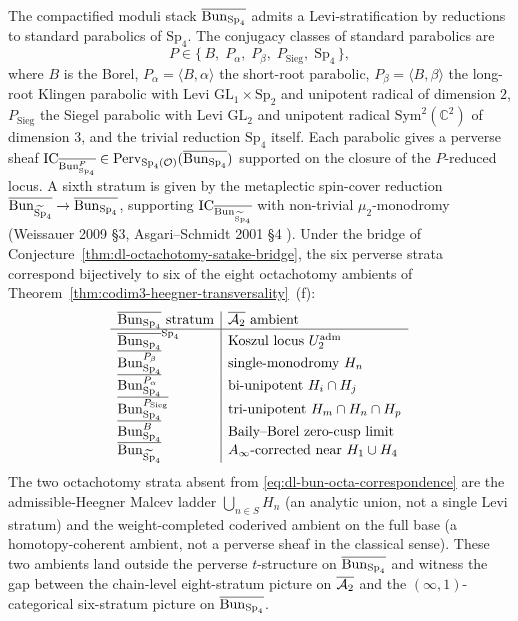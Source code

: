 \begin{remark}
\label{rem:dl-six-strata-bun-sp4}
%
%
The compactified moduli stack $\overline{\mathrm{Bun}_{\mathrm{Sp}_4}}$ admits a
Levi-stratification by reductions to standard parabolics of
$\mathrm{Sp}_4$. The conjugacy classes of standard parabolics are
\[
 P\in\bigl\{\,B,\;P_\alpha,\;P_\beta,\;P_{\mathrm{Sieg}},\;
 \mathrm{Sp}_4\,\bigr\},
\]
where $B$ is the Borel, $P_\alpha=\langle B,\alpha\rangle$ the
short-root parabolic, $P_\beta=\langle B,\beta\rangle$ the long-root
Klingen parabolic with Levi
$\mathrm{GL}_1\times\mathrm{Sp}_2$ and unipotent radical of
dimension $2$, $P_{\mathrm{Sieg}}$ the Siegel parabolic with Levi
$\mathrm{GL}_2$ and unipotent radical $\mathrm{Sym}^2(\mathbb{C}^2)$
of dimension $3$, and the trivial reduction $\mathrm{Sp}_4$ itself.
Each parabolic gives a perverse sheaf
$\mathrm{IC}_{\overline{\mathrm{Bun}_{\mathrm{Sp}_4}^P}}\in
\mathrm{Perv}_{\mathrm{Sp}_4(\mathcal{O})}(\overline{\mathrm{Bun}_{\mathrm{Sp}_4}})$ supported on
the closure of the $P$-reduced locus. A sixth stratum is given by
the metaplectic spin-cover reduction
$\overline{\mathrm{Bun}_{\widetilde{\mathrm{Sp}}_4}}\to\overline{\mathrm{Bun}_{\mathrm{Sp}_4}}$, supporting
$\mathrm{IC}_{\overline{\mathrm{Bun}_{\widetilde{\mathrm{Sp}}_4}}}$ with non-trivial $\mu_2$-monodromy
(Weissauer 2009 \S 3, Asgari--Schmidt 2001 \S 4
\cite{AsgariSchmidt2001GSp4}). Under the bridge of
Conjecture~\ref{thm:dl-octachotomy-satake-bridge}, the six perverse
strata correspond bijectively to six of the eight octachotomy
ambients of Theorem~\textup{\ref{thm:codim3-heegner-transversality}}~(f):
\begin{equation}
\label{eq:dl-bun-octa-correspondence}
\begin{array}{l|l}
\overline{\mathrm{Bun}_{\mathrm{Sp}_4}}\text{ stratum} & \overline{\mathcal{A}_2}\text{ ambient} \\\hline
\overline{\mathrm{Bun}_{\mathrm{Sp}_4}}^{\mathrm{Sp}_4} & \text{Koszul locus }
U_2^{\mathrm{adm}} \\
\overline{\mathrm{Bun}_{\mathrm{Sp}_4}^{P_\beta}} & \text{single-monodromy }H_n
\\
\overline{\mathrm{Bun}_{\mathrm{Sp}_4}^{P_\alpha}} & \text{bi-unipotent }H_i\cap H_j
\\
\overline{\mathrm{Bun}_{\mathrm{Sp}_4}^{P_{\mathrm{Sieg}}}} &
\text{tri-unipotent }H_m\cap H_n\cap H_p
\\
\overline{\mathrm{Bun}_{\mathrm{Sp}_4}^{B}} & \text{Baily--Borel zero-cusp limit}
\\
\overline{\mathrm{Bun}_{\widetilde{\mathrm{Sp}}_4}} & A_\infty\text{-corrected near }H_1\cup H_4
\end{array}
\end{equation}
The two octachotomy strata absent from
\eqref{eq:dl-bun-octa-correspondence} are the
admissible-Heegner Malcev ladder
$\bigcup_{n\in S}H_n$ (an analytic union, not a single Levi
stratum) and the weight-completed coderived ambient on the full
base (a homotopy-coherent ambient, not a perverse sheaf in the
classical sense). These two ambients land outside the perverse
$t$-structure on $\overline{\mathrm{Bun}_{\mathrm{Sp}_4}}$ and witness the gap between
the chain-level eight-stratum picture on $\overline{\mathcal{A}_2}$ and the
$(\infty,1)$-categorical six-stratum picture on
$\overline{\mathrm{Bun}_{\mathrm{Sp}_4}}$.
\end{remark}

